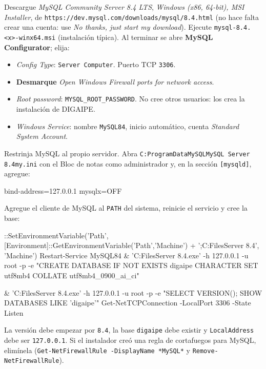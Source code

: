 Descargue \emph{MySQL Community Server 8.4 LTS}, \emph{Windows (x86, 64-bit), MSI Installer}, de
\texttt{https://dev.mysql.com/downloads/mysql/8.4.html} (no hace falta crear una cuenta: use
\emph{No thanks, just start my download}). Ejecute \texttt{mysql-8.4.<x>-winx64.msi}
(instalación típica). Al terminar se abre
\textbf{MySQL Configurator}; elija:

\begin{itemize}
	\item \emph{Config Type}: \texttt{Server Computer}. Puerto TCP \texttt{3306}.
	\item \textbf{Desmarque} \emph{Open Windows Firewall ports for network access}.
	\item \emph{Root password}: \texttt{MYSQL\_ROOT\_PASSWORD}. No cree otros usuarios: los crea la
	      instalación de DIGAIPE.
	\item \emph{Windows Service}: nombre \texttt{MySQL84}, inicio automático, cuenta
	      \emph{Standard System Account}.
\end{itemize}

Restrinja MySQL al propio servidor. Abra \texttt{C:\bs ProgramData\bs MySQL\bs MySQL Server
8.4\bs my.ini} con el Bloc de notas como administrador y, en la sección \texttt{[mysqld]},
agregue:

\begin{codigo}[label={my.ini, sección [mysqld]}]
bind-address=127.0.0.1
mysqlx=OFF
\end{codigo}

Agregue el cliente de MySQL al \texttt{PATH} del sistema, reinicie el servicio y cree la base:

\begin{codigo}
[Environment]::SetEnvironmentVariable('Path', [Environment]::GetEnvironmentVariable('Path','Machine') + ';C:\Program Files\MySQL\MySQL Server 8.4\bin', 'Machine')
Restart-Service MySQL84
& 'C:\Program Files\MySQL\MySQL Server 8.4\bin\mysql.exe' -h 127.0.0.1 -u root -p -e "CREATE DATABASE IF NOT EXISTS digaipe CHARACTER SET utf8mb4 COLLATE utf8mb4_0900_ai_ci"
\end{codigo}

\begin{comprobar}
	\begin{codigo}
& 'C:\Program Files\MySQL\MySQL Server 8.4\bin\mysql.exe' -h 127.0.0.1 -u root -p -e "SELECT VERSION(); SHOW DATABASES LIKE 'digaipe'"
Get-NetTCPConnection -LocalPort 3306 -State Listen
	\end{codigo}
	La versión debe empezar por \texttt{8.4}, la base \texttt{digaipe} debe existir y
	\texttt{LocalAddress} debe ser \texttt{127.0.0.1}. Si el instalador creó una regla de
	cortafuegos para MySQL, elimínela (\texttt{Get-NetFirewallRule -DisplayName *MySQL*} y
	\texttt{Remove-NetFirewallRule}).
\end{comprobar}


